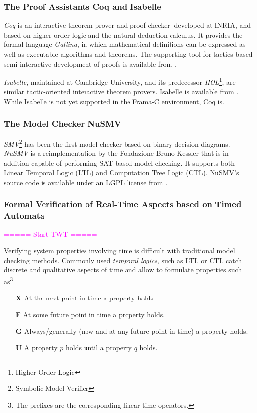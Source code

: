 \documentclass{template/openetcs_report}
\begin{document}
\subsubsection{The Proof Assistants Coq and Isabelle}


{\em Coq} is an interactive theorem prover and proof checker,
developed at INRIA, and based on
higher-order logic and the natural deduction calculus.
%
It provides the formal language {\em Gallina}, in which
mathematical definitions can be expressed as well as
executable algorithms and theorems.
%
The supporting tool for tactics-based semi-interactive development of
proofs is available from \cite{coq}.
%

{\em Isabelle}, maintained at Cambridge University,
and its predecessor {\em HOL}\footnote{
        Higher Order Logic
},
are similar tactic-oriented interactive theorem provers.
%
Isabelle is available from \cite{isabelle}.
%
While Isabelle is not yet supported in the Frama-C environment,
Coq is.


\subsubsection{The Model Checker NuSMV}

{\em SMV}\footnote{
        Symbolic Model Verifier
}
has been the first model checker based on binary decision
diagrams.
%
{\em NuSMV} is a reimplementation by the Fondazione Bruno Kessler
that is in addition capable of
performing SAT-based model-checking.
%
It supports both
Linear Temporal Logic (LTL) and Computation Tree Logic (CTL).
%
NuSMV's source code is available under an LGPL license from
\cite{nusmv}.


\subsubsection{Formal Verification of Real-Time Aspects based on Timed Automata}
\label{sct:twt:descrTA}

\textcolor{magenta}{===== Start TWT =====}

Verifying system properties involving time is difficult with traditional model checking methods. Commonly used \emph{temporal logics}, such as LTL or CTL catch discrete and qualitative aspects of time and allow to formulate properties such as\footnote{The prefixes are the corresponding linear time operators.}
\begin{itemize}
  \item[\bf X] At the next point in time a property holds.
  \item[\bf F] At some future point in time a property holds.
  \item[\bf G] Always/generally (now and at any future point in time) a property holds.
  \item[\bf U] A property $p$ holds until a property $q$ holds.
\end{itemize}
\end{document}
